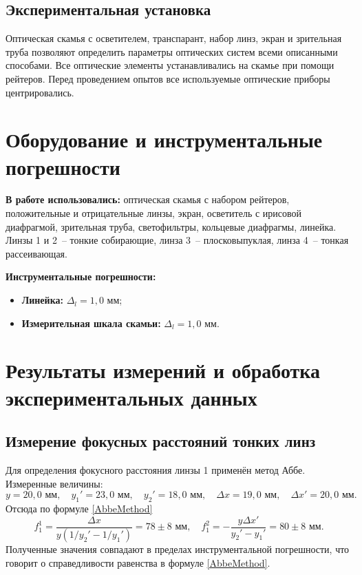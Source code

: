 \documentclass[a4paper,12pt]{article} %
\begin{document}
\subsection{Экспериментальная установка}

Оптическая скамья с осветителем, транспарант, набор линз, экран и зрительная труба позволяют определить параметры оптических систем всеми описанными способами. Все оптические элементы устанавливались на скамье при помощи рейтеров. Перед проведением опытов все используемые оптические приборы центрировались.

\section{Оборудование и инструментальные погрешности}

\textbf{В работе использовались:} оптическая скамья с набором рейтеров, положительные и отрицательные линзы, экран, осветитель с ирисовой диафрагмой, зрительная труба, светофильтры, кольцевые диафрагмы, линейка. Линзы 1 и 2~-- тонкие собирающие, линза 3~-- плосковыпуклая, линза 4~-- тонкая рассеивающая.

\textbf{Инструментальные погрешности:}
\begin{itemize}
    \item \textbf{Линейка:} $\Delta_l = 1,0$ мм;
    \item \textbf{Измерительная шкала скамьи:} $\Delta_l = 1,0$ мм.
\end{itemize}

\section{Результаты измерений и обработка экспериментальных данных}

\subsection{Измерение фокусных расстояний тонких линз}

Для определения фокусного расстояния линзы 1 применён метод Аббе. Измеренные величины: 
$$y = 20,0\text{ мм},\quad y_1'=23,0\text{ мм},\quad y_2'=18,0\text{ мм},\quad
\Delta x = 19,0\text{ мм},\quad\Delta x'=20,0\text{ мм}.$$
Отсюда по формуле \eqref{AbbeMethod}
$$f_1^1 = \frac{\Delta x}{y(1/y_2' - 1/y_1')} = 78 \pm 8 \text{ мм},\quad f_1^2 = -\frac{y\Delta x'}{y_2' - y_1'} = 80 \pm 8 \text{ мм}.$$
Полученные значения совпадают в пределах инструментальной погрешности, что говорит о справедливости равенства в формуле \eqref{AbbeMethod}.
\end{document}

